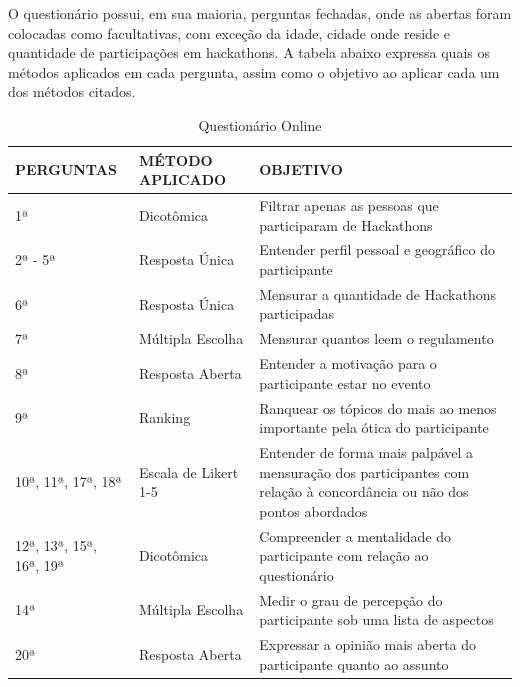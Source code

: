 O questionário possui, em sua maioria, perguntas fechadas, onde as abertas foram colocadas como facultativas, com exceção da idade, cidade onde reside e quantidade de participações em hackathons. A tabela abaixo expressa quais os métodos aplicados em cada pergunta, assim como o objetivo ao aplicar cada um dos métodos citados.
\begin{table}[H]
\centering
\caption{Questionário Online}
\label{tab:questionario}
\begin{tabular}{|l|l|p{}|}
\hline
\textbf{PERGUNTAS}      & \textbf{MÉTODO APLICADO} & \textbf{OBJETIVO}                                                                                                     \\ \hline
1ª                      & Dicotômica               & Filtrar apenas as pessoas que participaram de Hackathons                                                              \\ \hline
2ª - 5ª                 & Resposta Única           & Entender perfil pessoal e geográfico do participante                                                                  \\ \hline
6ª                      & Resposta Única           & Mensurar a quantidade de Hackathons participadas                                                                      \\ \hline
7ª                      & Múltipla Escolha         & Mensurar quantos leem o regulamento                                                                                   \\ \hline
8ª                      & Resposta Aberta          & Entender a motivação para o participante estar no evento                                                              \\ \hline
9ª                      & Ranking                  & Ranquear os tópicos do mais ao menos importante pela ótica do participante                                            \\ \hline
10ª, 11ª, 17ª, 18ª      & Escala de Likert 1-5     & Entender de forma mais palpável a mensuração dos participantes com relação à concordância ou não dos pontos abordados \\ \hline
12ª, 13ª, 15ª, 16ª, 19ª & Dicotômica               & Compreender a mentalidade do participante com relação ao questionário                                                 \\ \hline
14ª                     & Múltipla Escolha         & Medir o grau de percepção do participante sob uma lista de aspectos                                                   \\ \hline
20ª                     & Resposta Aberta          & Expressar a opinião mais aberta do participante quanto ao assunto                                                     \\ \hline
\end{tabular}
\end{table}



